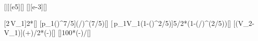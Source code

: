 [\bar][e5][\pascal]
[\liter][e-3][\m\cubed]

[2\,V_1]{2*\VaX}[\m\cubed]
[p_1\left(\right)^{7/5}]{\paX*(\VaX/\VbX)^(7/5)}[\pascal]
[\,p_1V_1\left(1-\left(\right)^{2/5}\right)]{5/2*\paX*\VaX*(1-(\VaX/\VbX)^(2/5))}[\joule]
[\left(V_2-V_1\right)]{(\paX+\pbX)/2*(\VbX-\VaX)}[\joule]
[]{100*(\WliX-\WadX)/\WadX}[\percent]
